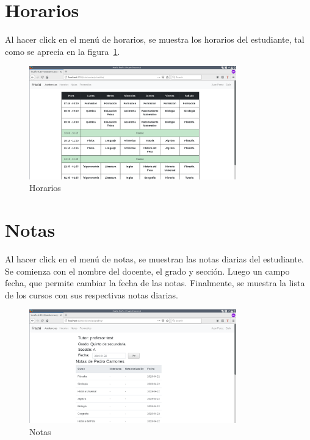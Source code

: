 \documentclass[12pt]{article}
\begin{document}
\newpage
\section{Horarios}
Al hacer click en el men\'u de horarios, se muestra los horarios del estudiante, tal como se
aprecia en la figura~\ref{fig:horarios}.
\begin{figure}[ht]
  \centering
  \includegraphics[width=0.8\textwidth]{images/apoderado2.png}
  \caption{Horarios}
  \label{fig:horarios}
\end{figure}

\newpage
\section{Notas}
Al hacer click en el men\'u de notas, se muestran las notas diarias del estudiante. 
Se comienza con el nombre del docente, el grado y secci\'on. Luego un campo fecha, que permite
cambiar la fecha de las notas.
Finalmente, se muestra la lista de los cursos con sus respectivas notas diarias.
\begin{figure}[ht]
  \centering
  \includegraphics[width=0.8\textwidth]{images/apoderado3.png}
  \caption{Notas}
  \label{fig:notas}
\end{figure}
\end{document}
